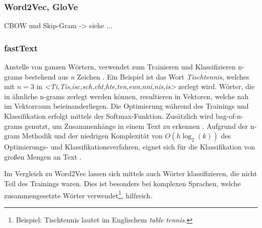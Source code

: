 


\subsubsection*{Word2Vec, GloVe}


CBOW und Skip-Gram -> siehe ...

\subsubsection*{fastText}

Anstelle von ganzen Wörtern, verwendet \ft zum Trainieren und Klassifizieren n-grams bestehend aus \textit{n} Zeichen \autocite{kowsari_text_2019, joulin_fasttextzip_2016}. Ein Beispiel ist das Wort \textit{Tischtennis}, welches mit \(n = 3\) in \textit{<Ti,Tis,isc,sch,cht,hte,ten,enn,nni,nis,is>} zerlegt wird. Wörter, die in ähnliche n-grams zerlegt werden können, resultieren in Vektoren, welche nah im Vektorraum beieinanderliegen. Die Optimierung während des Trainings und Klassifikation erfolgt mittels der Softmax-Funktion. Zusätzlich wird bag-of-n-grams genutzt, um Zusammenhänge in einem Text zu erkennen \autocite[2]{joulin_bag_2016}. Aufgrund der n-gram Methodik und der niedrigen Komplexität von \(O(h \log_{2}(k))\) des Optimierungs- und Klassifikationsverfahren, eignet sich \ft für die Klassifikation von großen Mengen an Text \autocite[2\psqq]{joulin_bag_2016}.

Im Vergleich zu Word2Vec lassen sich mittels \ft auch Wörter klassifizieren, die nicht Teil des Trainings waren. Dies ist besonders bei komplexen Sprachen, welche zusammengesetzte Wörter verwendet\footnote{Beispiel: Tischtennis lautet im Englischem \textit{table tennis}.}, hilfreich.


